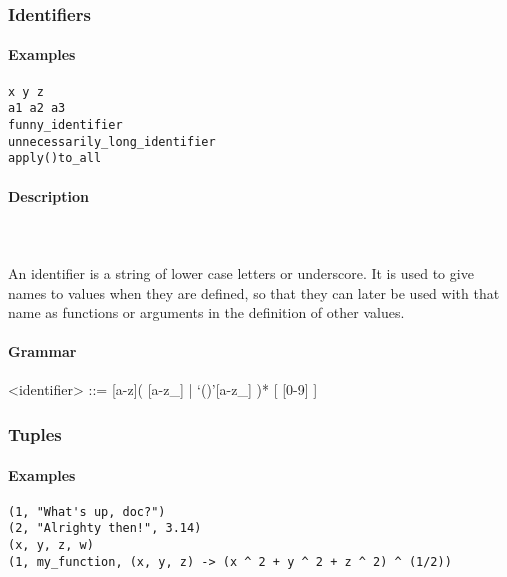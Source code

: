 \documentclass{article}
\def\pend{\mbox{} \\\\}
\begin{document}
\subsubsection{Identifiers}

\paragraph{Examples}

\begin{verbatim}
x y z
a1 a2 a3 
funny_identifier 
unnecessarily_long_identifier
apply()to_all
\end{verbatim}

\paragraph{Description}\pend
An identifier is a string of lower case letters or underscore. It is used to give
names to values when they are defined, so that they can later be used with that 
name as functions or arguments in the definition of other values.

\paragraph{Grammar}
\begin{grammar}
<identifier> ::= [a-z]( [a-z_] | `()'[a-z_] )* [ [0-9] ]
\end{grammar}

\newpage
\subsubsection{Tuples}

\paragraph{Examples}

\begin{verbatim}
(1, "What's up, doc?")
(2, "Alrighty then!", 3.14)
(x, y, z, w)
(1, my_function, (x, y, z) -> (x ^ 2 + y ^ 2 + z ^ 2) ^ (1/2))
\end{verbatim}
\end{document}
